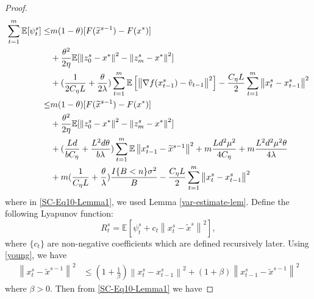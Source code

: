 \documentclass{article}
\newcommand*{\E}{\mathbb{E}}
\newcommand{\norm}[1]{\left\lVert#1\right\rVert}
\theoremstyle{definition}
\theoremstyle{remark}
\begin{document}
{\begin{proof}
\begin{align}
\sum_{t=1}^{m}\E[\psi_{t}^s] \leq &m(1-\theta)[F(\widetilde{x}^{s-1})-F(x^*)]\notag\\
&+ {\frac{ \theta^2}{2\eta}}\E[\norm{z_{0}^s-x^*}^2-\norm{z_{m}^s-x^*}^2]\notag\\
&+(\frac{1}{2C_{\eta} L}+\frac{\theta}{2\lambda})\sum_{t=1}^{m}\E\left[\norm{\nabla f(x_{t-1}^s)-\hat{v}_{t-1}}^2\right]-\frac{C_{\eta} L}{2}\sum_{t=1}^{m}\norm{x_{t}^s-x_{t-1}^s}^2\notag\\
\leq &m(1-\theta)[F(\widetilde{x}^{s-1})-F(x^*)] \notag\\
&+ {\frac{ \theta^2}{2\eta}}\E[\norm{z_{0}^s-x^*}^2-\norm{z_{m}^s-x^*}^2]\notag\\
&+(\frac{Ld}{bC_{\eta}}+\frac{L^2d\theta}{b\lambda})\sum_{t=1}^{m} \E\norm{x_{t-1}^s-\widetilde{x}^{s-1}}^2+m\frac{Ld^2\mu^2}{4C_{\eta}}+m\frac{ L^2d^2\mu^2\theta}{4\lambda}\notag\\
&+ m(\frac{1}{C_{\eta} L}+\frac{\theta}{\lambda})\frac{I\{B < n\} \sigma ^2}{B}-\frac{C_{\eta} L}{2}\sum_{t=1}^{m}\norm{x_{t}^s-x_{t-1}^s}^2\label{SC-Eq10-Lemma1}
\end{align}
where in \eqref{SC-Eq10-Lemma1}, we used Lemma \ref{var-estimate-lem}. Define the following Lyapunov function:
\begin{equation}
R_t^s = \E\left[\psi_{t}^s+ c_t\norm{x_t^s-\tilde{x}^s}^2\right],
\end{equation}
where $\{c_t\}$ are non-negative coefficients which are defined recursively later. Using \eqref{young}, we have
\begin{align}
\norm{x_{t}^s-\widetilde{x}^{s-1}}^2 &\leq (1+\frac{1}{\beta})\norm{x_{t}^s-x_{t-1}^s}^2+(1+\beta)\norm{x_{t-1}^s-\widetilde{x}^{s-1}}^2
\end{align}
where $\beta > 0$. Then from \eqref{SC-Eq10-Lemma1} we have 


\end{proof}}
\end{document}
